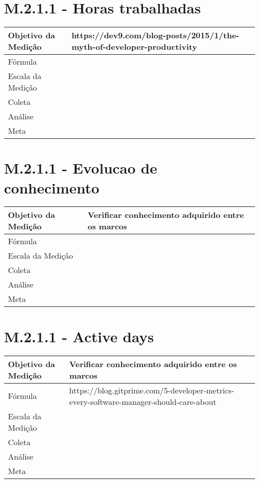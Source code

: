 \section{M.2.1.1 - Horas trabalhadas} %

	\begin{tabular}{ |p{5cm}|p{5cm}|  }
	 \hline
	 Objetivo da Medição 		& https://dev9.com/blog-posts/2015/1/the-myth-of-developer-productivity 	   \\
	 \hline
	 Fórmula		& 		\\
	 \hline
	 Escala da Medição 		& 		 \\
	 \hline
	 Coleta		& 		\\
	 \hline
	 Análise		& 		 \\
	 \hline
	 Meta		& 		 \\
	 \hline
	\end{tabular}

	\section{M.2.1.1 - Evolucao de conhecimento} %

	\begin{tabular}{ |p{5cm}|p{5cm}|  }
	 \hline
	 Objetivo da Medição 		& Verificar conhecimento adquirido entre os marcos	   \\
	 \hline
	 Fórmula		& 		\\
	 \hline
	 Escala da Medição 		& 		 \\
	 \hline
	 Coleta		& 		\\
	 \hline
	 Análise		& 		 \\
	 \hline
	 Meta		& 		 \\
	 \hline
	\end{tabular}

	\section{M.2.1.1 - Active days} %

	\begin{tabular}{ |p{5cm}|p{5cm}|  }
	 \hline
	 Objetivo da Medição 		& Verificar conhecimento adquirido entre os marcos	   \\
	 \hline
	 Fórmula		& 		https://blog.gitprime.com/5-developer-metrics-every-software-manager-should-care-about\\
	 \hline
	 Escala da Medição 		& 		 \\
	 \hline
	 Coleta		& 		\\
	 \hline
	 Análise		& 		 \\
	 \hline
	 Meta		& 		 \\
	 \hline
	\end{tabular}

